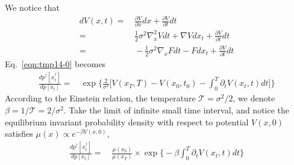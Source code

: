 \documentclass[aps, pre, preprint,unsortedaddress,a4paper,onecolumn]{revtex4-1}
\begin{document}
We notice that
\begin{align}\nonumber
  dV(x, t) = &\, \frac{\partial V}{\partial x} dx + \frac{\partial V}{\partial t} dt\\\nonumber
  =&\,
  \frac12 \sigma^2 \nabla^2_x V dt +  \nabla V dx_t + \frac{\partial V}{\partial t} dt \\
  =&\,
  -\frac12 \sigma^2 \nabla_x F dt -  F dx_t + \frac{\partial V}{\partial t} dt
\end{align}
Eq.~\eqref{eqn:tmp14-0} becomes
\begin{align}
  \frac{  dp^\dagger[x^\dagger_t] }{ dp[x_t]}
  =&\,
  \exp\bigg\{
  \frac2{\sigma^2}\bigg[
  V(x_T,T) - V(x_0,t_0) - \int_0^T\partial_tV(x_t,t)dt
  \bigg]
  \bigg\}
\end{align}
According to the  Einstein relation, the temperature $\mathcal T = \sigma^2/2$, we denote $\beta = 1/{\mathcal T} = 2/\sigma^2$.
Take the limit of infinite small time interval, and notice the equilibrium
invariant probability density with respect to potential $V(x,0)$ satisfies $\mu(x) \propto e^{-\beta V(x,0)}$,
\begin{align}
  \frac{  dp^\dagger[x^\dagger_t] }{ dp[x_t]}
  =&\,
  \frac{\mu(x_0)}{\mu(x_T)}\times
  \exp\bigg\{
  - \beta\int_0^T\partial_tV(x_t,t)dt
  \bigg\}
\end{align}
\end{document}

